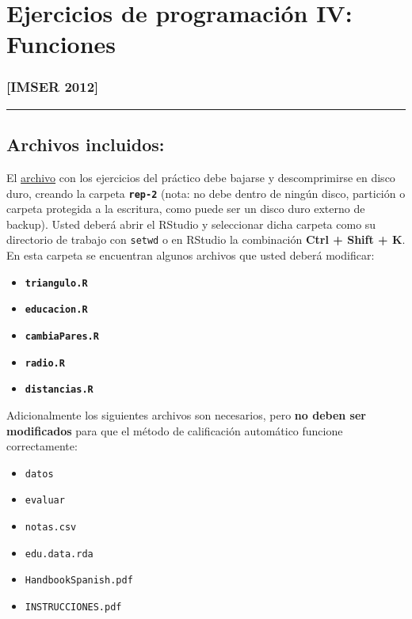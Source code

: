 \documentclass{article}
\begin{document}
\section{Ejercicios de programación IV: Funciones}

\subsubsection{{[}IMSER 2012{]}}

\begin{center}\rule{3in}{0.4pt}\end{center}

\subsection{Archivos incluidos:}

El
\href{http://eva.universidad.edu.uy/file.php/1454/ejercicios\_de\_programacion/rep-1.zip}{archivo}
con los ejercicios del práctico debe bajarse y descomprimirse en disco
duro, creando la carpeta \textbf{\texttt{rep-2}} (nota: no debe dentro
de ningún disco, partición o carpeta protegida a la escritura, como
puede ser un disco duro externo de backup). Usted deberá abrir el
RStudio y seleccionar dicha carpeta como su directorio de trabajo con
\verb!setwd! o en RStudio la combinación \textbf{Ctrl + Shift + K}. En
esta carpeta se encuentran algunos archivos que usted deberá modificar:

\begin{itemize}
\item
  \textbf{\texttt{triangulo.R}}
\item
  \textbf{\texttt{educacion.R}}
\item
  \textbf{\texttt{cambiaPares.R}}
\item
  \textbf{\texttt{radio.R}}
\item
  \textbf{\texttt{distancias.R}}
\end{itemize}
Adicionalmente los siguientes archivos son necesarios, pero \textbf{no
deben ser modificados} para que el método de calificación automático
funcione correctamente:

\begin{itemize}
\item
  \verb!datos!
\item
  \verb!evaluar!
\item
  \verb!notas.csv!
\item
  \verb!edu.data.rda!
\item
  \verb!HandbookSpanish.pdf!
\item
  \verb!INSTRUCCIONES.pdf!
\end{itemize}
\end{document}
